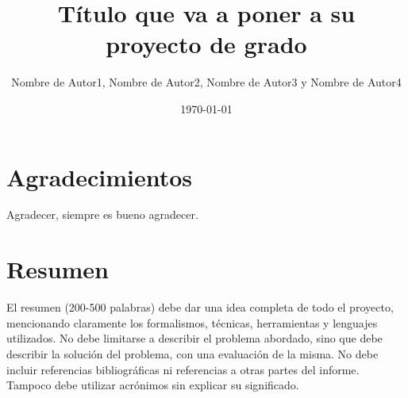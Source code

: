 \documentclass[oneside]{prgrado}
\title{Título que va a poner a su proyecto de grado}
\author{Nombre de Autor1, Nombre de Autor2, Nombre de Autor3 y Nombre de Autor4}
\date{\today}
\begin{document}

\frontmatter %

\maketitle



\chapter*{Agradecimientos}

Agradecer, siempre es bueno agradecer.




\chapter*{Resumen}

El resumen (200-500 palabras) debe dar una idea completa de todo el
proyecto, mencionando claramente los formalismos, técnicas, herramientas y lenguajes
utilizados. No debe limitarse a describir el problema abordado, sino que debe describir
la solución del problema, con una evaluación de la misma. No debe incluir referencias
bibliográficas ni referencias a otras partes del informe. Tampoco debe utilizar
acrónimos sin explicar su significado.


\hfill \break
{}


\tableofcontents
\newpage



\mainmatter %
\end{document}

